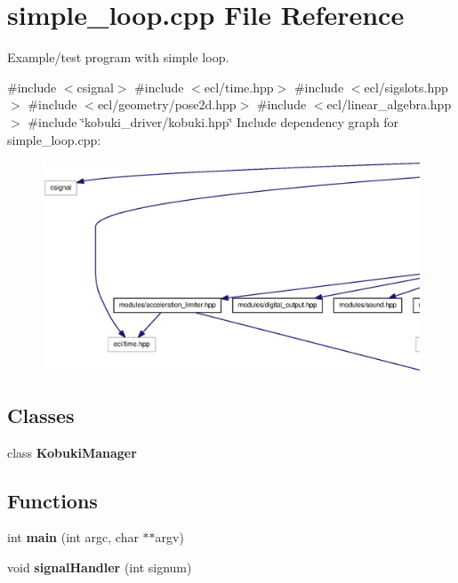 \section{simple\-\_\-loop.\-cpp \-File \-Reference}
\label{simple__loop_8cpp}


\-Example/test program with simple loop.  


{\ttfamily \#include $<$csignal$>$}\*
{\ttfamily \#include $<$ecl/time.\-hpp$>$}\*
{\ttfamily \#include $<$ecl/sigslots.\-hpp$>$}\*
{\ttfamily \#include $<$ecl/geometry/pose2d.\-hpp$>$}\*
{\ttfamily \#include $<$ecl/linear\-\_\-algebra.\-hpp$>$}\*
{\ttfamily \#include \char`\"{}kobuki\-\_\-driver/kobuki.\-hpp\char`\"{}}\*
\-Include dependency graph for simple\-\_\-loop.\-cpp\-:
\nopagebreak
\begin{figure}[H]
\begin{center}
\leavevmode
\includegraphics[width=350pt]{simple__loop_8cpp__incl}
\end{center}
\end{figure}
\subsection*{\-Classes}
\begin{DoxyCompactItemize}
\item 
class {\bf \-Kobuki\-Manager}
\end{DoxyCompactItemize}
\subsection*{\-Functions}
\begin{DoxyCompactItemize}
\item 
int {\bf main} (int argc, char $\ast$$\ast$argv)
\item 
void {\bf signal\-Handler} (int signum)
\end{DoxyCompactItemize}
